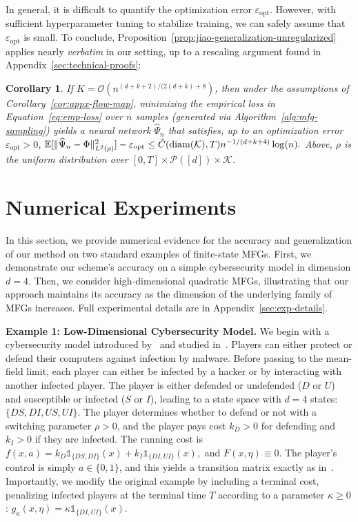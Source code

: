 \documentclass[11pt,reqno]{amsart}
\numberwithin{equation}{section}
\theoremstyle{plain}
\newtheorem{corollary}[theorem]{Corollary}
\newcommand{\E}{\mathbb{E}}
\newcommand{\calK}{{\mathcal K}}
\newcommand{\calP}{{\mathcal P}}
\newcommand{\1}{\boldsymbol{\mathbbm{1}}}
\begin{document}
In general, it is difficult to quantify the optimization error $\varepsilon_{\mathrm{opt}}$. However, with sufficient hyperparameter tuning to stabilize training, we can safely assume that $\varepsilon_{\mathrm{opt}}$ is small. To conclude, Proposition~\ref{prop:jiao-generalization-unregularized} applies nearly \textit{verbatim} in our setting, up to a rescaling argument found in Appendix~\ref{sec:technical-proofs}:
\begin{corollary}
\label{cor:sample-complexity}
If $K = \mathcal{O}(n^{(d + k + 2) / (2(d + k) + 8})$, then under the assumptions of Corollary~\ref{cor:appx-flow-map}, minimizing the empirical loss in Equation~\eqref{eq:emp-loss} over $n$ samples (generated via Algorithm~\ref{alg:mfg-sampling}) yields a neural network $\widehat{\Psi}_n$ that satisfies, up to an optimization error $\varepsilon_{\mathrm{opt}} > 0$,
$
    \E[\|\widehat{\Psi}_n - \Phi\|_{L^2(\rho)}^2] - \varepsilon_{\mathrm{opt}} \leq \Tilde{C}(\mathrm{diam}(\calK), T) n^{-1/(d + k + 4)} \log(n).
$
Above, $\rho$ is the uniform distribution over $[0, T] \times \calP([d]) \times \calK$.
\end{corollary}

\section{Numerical Experiments}
\label{sec:num-exps}
In this section, we provide numerical evidence for the accuracy and generalization of our method on two standard examples of finite-state MFGs. First, we demonstrate our scheme's accuracy on a simple cybersecurity model in dimension $d = 4$. Then, we consider high-dimensional quadratic MFGs, illustrating that our approach maintains its accuracy as the dimension of the underlying family of MFGs increases. Full experimental details are in Appendix~\ref{sec:exp-details}.

\noindent\textbf{Example 1: Low-Dimensional Cybersecurity Model. }
We begin with a cybersecurity model introduced by~\cite{MR3575619} and studied in~\citep[Section 7.4]{coh-lau-zel2025}. Players can either protect or defend their computers against infection by malware. Before passing to the mean-field limit, each player can either be infected by a hacker or by interacting with another infected player. The player is either defended or undefended ($D$ or $U$) and susceptible or infected ($S$ or $I$), leading to a state space with $d = 4$ states: $\{DS, DI, US, UI\}$. The player determines whether to defend or not with a switching parameter $\rho > 0$, and the player pays cost $k_D > 0$ for defending and $k_I > 0$ if they are infected. The running cost is
$
    f(x, a) = k_{D} \mathds{1}_{\{DS, DI\}}(x) + k_I \mathds{1}_{\{DI, UI\}}(x),
$
and $F(x, \eta) \equiv 0$. The player's control is simply $a \in \{0, 1\}$, and this yields a transition matrix exactly as in~\cite[Section 7.4]{coh-lau-zel2025}. Importantly, we modify the original example by including a terminal cost, penalizing infected players at the terminal time $T$ according to a parameter $\kappa \ge 0$:
$
    g_\kappa(x, \eta) = \kappa \mathds{1}_{\{DI, UI\}}(x).
$
\end{document}

